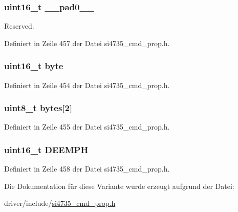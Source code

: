 \subsubsection[{\+\_\+\+\_\+pad0\+\_\+\+\_\+}]{\setlength{\rightskip}{0pt plus 5cm}uint16\+\_\+t \+\_\+\+\_\+pad0\+\_\+\+\_\+}\label{unionfm__deemphasis_a77132c2c26a75f5b8751b235cda23828}


Reserved. 



Definiert in Zeile 457 der Datei si4735\+\_\+cmd\+\_\+prop.\+h.

\hypertarget{unionfm__deemphasis_ab0549c1b5ea980a02e7eab77e21fea49}{}
\subsubsection[{byte}]{\setlength{\rightskip}{0pt plus 5cm}uint16\+\_\+t byte}\label{unionfm__deemphasis_ab0549c1b5ea980a02e7eab77e21fea49}


Definiert in Zeile 454 der Datei si4735\+\_\+cmd\+\_\+prop.\+h.

\hypertarget{unionfm__deemphasis_a46e4c05d20a047ec169f60d3167e912e}{}
\subsubsection[{bytes}]{\setlength{\rightskip}{0pt plus 5cm}uint8\+\_\+t bytes\mbox{[}2\mbox{]}}\label{unionfm__deemphasis_a46e4c05d20a047ec169f60d3167e912e}


Definiert in Zeile 455 der Datei si4735\+\_\+cmd\+\_\+prop.\+h.

\hypertarget{unionfm__deemphasis_abc844751c522212f064b9e723213950f}{}
\subsubsection[{D\+E\+E\+M\+P\+H}]{\setlength{\rightskip}{0pt plus 5cm}uint16\+\_\+t D\+E\+E\+M\+P\+H}\label{unionfm__deemphasis_abc844751c522212f064b9e723213950f}


Definiert in Zeile 458 der Datei si4735\+\_\+cmd\+\_\+prop.\+h.



Die Dokumentation für diese Variante wurde erzeugt aufgrund der Datei\+:\begin{DoxyCompactItemize}
\item 
driver/include/\hyperlink{si4735__cmd__prop_8h}{si4735\+\_\+cmd\+\_\+prop.\+h}\end{DoxyCompactItemize}
